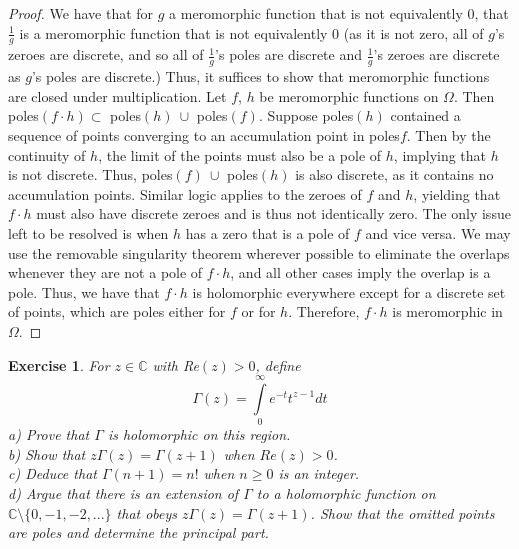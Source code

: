 \documentclass{article}
\newcommand{\bb}[1]{\mathbb{#1}}
\newtheorem{exercise}{Exercise}
\begin{document}
\begin{proof}
  We have that for $g$ a meromorphic function that is not equivalently $0$, that $\frac{1}{g}$ is a meromorphic function that is not equivalently $0$ (as it is not zero, all of $g$'s zeroes are discrete, and so all of $\frac{1}{g}$'s poles are discrete and $\frac{1}{g}$'s zeroes are discrete as $g$'s poles are discrete.) Thus, it suffices to show that meromorphic functions are closed under multiplication. Let $f$, $h$ be meromorphic functions on $\Omega$. Then poles$(f\cdot h) \subset$ poles$(h) \ \cup$ poles$(f)$. Suppose poles$(h)$ contained a sequence of points converging to an accumulation point in poles$f$. Then by the continuity of $h$, the limit of the points must also be a pole of $h$, implying that $h$ is not discrete. Thus, poles$(f) \ \cup$ poles$(h)$ is also discrete, as it contains no accumulation points. Similar logic applies to the zeroes of $f$ and $h$, yielding that $f \cdot h$ must also have discrete zeroes and is thus not identically zero. The only issue left to be resolved is when $h$ has a zero that is a pole of $f$ and vice versa. We may use the removable singularity theorem wherever possible to eliminate the overlaps whenever they are not a pole of $f \cdot h$, and all other cases imply the overlap is a pole. Thus, we have that $f \cdot h$ is holomorphic everywhere except for a discrete set of points, which are poles either for $f$ or for $h$. Therefore, $f \cdot h$ is meromorphic in $\Omega$.  
\end{proof}
\begin{exercise}
  For $z \in \bb{C}$ with Re$(z) > 0$, define
  \[
    \Gamma(z) = \int\limits_{0}^{\infty} e^{-t}t^{z-1}dt
  \]
  a) Prove that $\Gamma$ is holomorphic on this region. \\
  b) Show that $z\Gamma(z) = \Gamma(z+1)$ when $Re(z)>0$. \\
  c) Deduce that $\Gamma(n+1) = n!$ when $n\geq 0$ is an integer. \\
  d) Argue that there is an extension of $\Gamma$ to a holomorphic function on $\bb{C} \setminus \{0,-1,-2, ...\}$ that obeys $z\Gamma(z) = \Gamma(z+1)$. Show that the omitted points are poles and determine the principal part.
\end{exercise}
\end{document}
